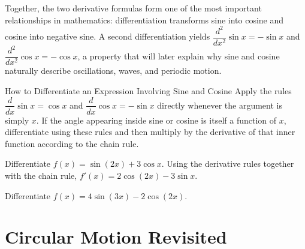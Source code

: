 Together, the two derivative formulas form one of the most important
relationships in mathematics: differentiation transforms sine into
cosine and cosine into negative sine. A second differentiation yields
$\dfrac{d^2}{dx^2}\sin x = -\sin x$ and $\dfrac{d^2}{dx^2}\cos x =
-\cos x$, a property that will later explain why sine and cosine
naturally describe oscillations, waves, and periodic motion.

\begin{algorithmproc}{How to Differentiate an Expression Involving Sine and Cosine}
Apply the rules $\dfrac{d}{dx}\sin x = \cos x$ and $\dfrac{d}{dx}\cos x =
-\sin x$ directly whenever the argument is simply $x$. If the angle
appearing inside sine or cosine is itself a function of $x$, differentiate
using these rules and then multiply by the derivative of that inner
function according to the chain rule.
\end{algorithmproc}

\begin{example}
Differentiate $f(x) = \sin(2x) + 3\cos x$. Using the derivative rules
together with the chain rule, $f'(x) = 2\cos(2x) - 3\sin x$.
\end{example}

\begin{practicenow}
Differentiate $f(x) = 4\sin(3x) - 2\cos(2x)$.
\end{practicenow}

\section{Circular Motion Revisited}

